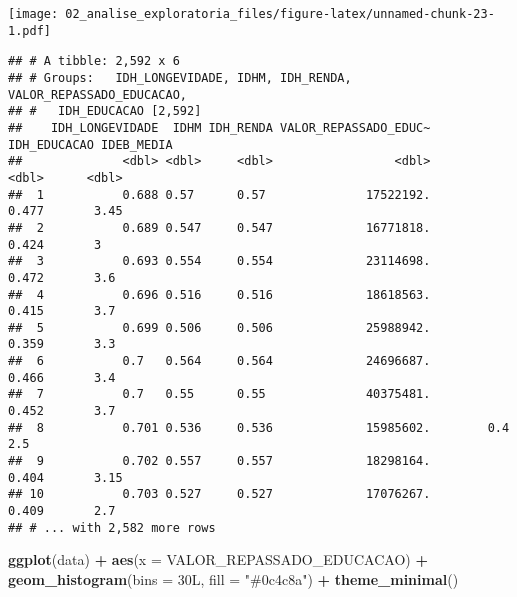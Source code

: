 \documentclass[
]{article}
\newenvironment{Shaded}{\begin{snugshade}}{\end{snugshade}}
\newcommand{\DataTypeTok}[1]{\textcolor[rgb]{0.13,0.29,0.53}{#1}}
\newcommand{\KeywordTok}[1]{\textcolor[rgb]{0.13,0.29,0.53}{\textbf{#1}}}
\newcommand{\NormalTok}[1]{#1}
\newcommand{\OperatorTok}[1]{\textcolor[rgb]{0.81,0.36,0.00}{\textbf{#1}}}
\newcommand{\StringTok}[1]{\textcolor[rgb]{0.31,0.60,0.02}{#1}}
\begin{document}
\texttt{[image: 02\_analise\_exploratoria\_files/figure-latex/unnamed-chunk-23-1.pdf]}

\begin{Shaded}
\end{Shaded}

\begin{verbatim}
## # A tibble: 2,592 x 6
## # Groups:   IDH_LONGEVIDADE, IDHM, IDH_RENDA, VALOR_REPASSADO_EDUCACAO,
## #   IDH_EDUCACAO [2,592]
##    IDH_LONGEVIDADE  IDHM IDH_RENDA VALOR_REPASSADO_EDUC~ IDH_EDUCACAO IDEB_MEDIA
##              <dbl> <dbl>     <dbl>                 <dbl>        <dbl>      <dbl>
##  1           0.688 0.57      0.57              17522192.        0.477       3.45
##  2           0.689 0.547     0.547             16771818.        0.424       3   
##  3           0.693 0.554     0.554             23114698.        0.472       3.6 
##  4           0.696 0.516     0.516             18618563.        0.415       3.7 
##  5           0.699 0.506     0.506             25988942.        0.359       3.3 
##  6           0.7   0.564     0.564             24696687.        0.466       3.4 
##  7           0.7   0.55      0.55              40375481.        0.452       3.7 
##  8           0.701 0.536     0.536             15985602.        0.4         2.5 
##  9           0.702 0.557     0.557             18298164.        0.404       3.15
## 10           0.703 0.527     0.527             17076267.        0.409       2.7 
## # ... with 2,582 more rows
\end{verbatim}

\begin{Shaded}
\begin{Highlighting}[]
\KeywordTok{ggplot}\NormalTok{(data) }\OperatorTok{+}
\StringTok{  }\KeywordTok{aes}\NormalTok{(}\DataTypeTok{x =}\NormalTok{ VALOR\_REPASSADO\_EDUCACAO) }\OperatorTok{+}
\StringTok{  }\KeywordTok{geom\_histogram}\NormalTok{(}\DataTypeTok{bins =}\NormalTok{ 30L, }\DataTypeTok{fill =} \StringTok{"\#0c4c8a"}\NormalTok{) }\OperatorTok{+}
\StringTok{  }\KeywordTok{theme\_minimal}\NormalTok{()}
\end{Highlighting}
\end{Shaded}
\end{document}
